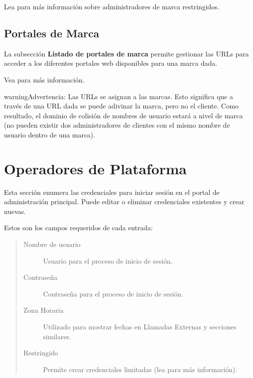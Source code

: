 \documentclass[letterpaper,10pt,spanish]{sphinxmanual}
\begin{document}
Lea {\hyperref[api_rest/acls:acls]{}} para más información sobre administradores de marca restringidos.


\subsection{Portales de Marca}
\label{administration_portal/platform/brands:brand-portals}\label{administration_portal/platform/brands:id3}
La subsección \textbf{Listado de portales de marca} permite gestionar las URLs para acceder a los diferentes portales web disponibles para una marca dada.

Vea {\hyperref[administration_portal/brand/settings/client_portals:id1]{}} para más información.

\begin{notice}{warning}{Advertencia:}
Las URLs se asignan a las marcas. Esto significa que a través de una URL dada se puede adivinar la marca, pero no el cliente. Como resultado, el dominio de colisión de nombres de usuario estará a nivel de marca (no pueden existir dos administradores de clientes con el mismo nombre de usuario dentro de una marca).
\end{notice}


\section{Operadores de Plataforma}
\label{administration_portal/platform/main_operators::doc}\label{administration_portal/platform/main_operators:main-operators}\label{administration_portal/platform/main_operators:id1}
Esta sección enumera las credenciales para iniciar sesión en el portal de administración principal. Puede editar o eliminar credenciales existentes y crear nuevas.

Estos son los campos requeridos de cada entrada:
\begin{quote}
\begin{description}
\item[{Nombre de usuario}] \leavevmode
Usuario para el proceso de inicio de sesión.

\item[{Contraseña}] \leavevmode
Contraseña para el proceso de inicio de sesión.

\item[{Zona Horaria}] \leavevmode
Utilizado para mostrar fechas en Llamadas Externas y secciones similares.

\item[{Restringido}] \leavevmode
Permite crear credenciales limitadas (lea {\hyperref[api_rest/acls:acls]{}} para más información).

\end{description}
\end{quote}
\end{document}
